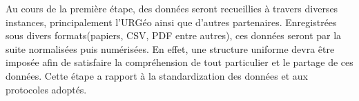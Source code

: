 \par
Au cours de la première étape, des données seront recueillies à 
travers diverses instances, principalement l'URGéo ainsi que d'autres partenaires. 
Enregistrées sous divers formats(papiers, CSV, PDF entre autres), 
ces données seront par la suite normalisées puis numérisées. En 
effet, une structure uniforme devra être imposée afin de satisfaire la 
compréhension de tout particulier et le partage de ces données.
Cette étape a rapport à la standardization des données et aux protocoles adoptés.